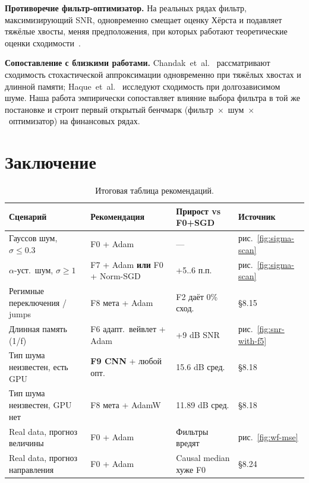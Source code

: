\documentclass[conference]{IEEEtran}
\begin{document}
\textbf{Противоречие фильтр-оптимизатор.} На реальных рядах фильтр,
максимизирующий SNR, одновременно смещает оценку Хёрста и подавляет
тяжёлые хвосты, меняя предположения, при которых работают теоретические
оценки сходимости~\cite{defossez2022adam}.

\textbf{Сопоставление с близкими работами.}
Chandak~et~al.~\cite{chandak2026hl} рассматривают сходимость
стохастической аппроксимации одновременно при тяжёлых хвостах и длинной
памяти; Haque~et~al.~\cite{haque2012lrd} исследуют сходимость при
долгозависимом шуме. Наша работа эмпирически сопоставляет влияние
выбора фильтра в той же постановке и строит первый открытый
бенчмарк (фильтр~$\times$~шум~$\times$~оптимизатор) на финансовых рядах.

\section{Заключение}

\begin{table}[htbp]
\centering\small
\caption{Итоговая таблица рекомендаций.}
\label{tab:final}
\begin{tabular}{p{3.5cm}p{4cm}p{2.5cm}p{2cm}}
\toprule
Сценарий & Рекомендация & Прирост vs F0+SGD & Источник \\
\midrule
Гауссов шум, $\sigma\le0.3$       & F0 + Adam & ---             & рис.~\ref{fig:sigma-scan} \\
$\alpha$-уст.\ шум, $\sigma\ge1$   & F7 + Adam \textbf{или} F0 + Norm-SGD & +5..6 п.п. & рис.~\ref{fig:sigma-scan} \\
Регимные переключения / jumps      & F8 мета + Adam & F2 даёт 0\% сход. & §8.15 \\
Длинная память (1/f)               & F6 адапт.\ вейвлет + Adam & +9 dB SNR & рис.~\ref{fig:snr-with-f5} \\
Тип шума неизвестен, есть GPU      & \textbf{F9 CNN} + любой опт. & 15.6 dB сред. & §8.18 \\
Тип шума неизвестен, GPU нет       & F8 мета + AdamW & 11.89 dB сред. & §8.18 \\
Real data, прогноз величины        & F0 + Adam & Фильтры вредят & рис.~\ref{fig:wf-mse} \\
Real data, прогноз направления     & F0 + Adam & Causal median хуже F0 & §8.24 \\
\bottomrule
\end{tabular}
\end{table}
\end{document}
